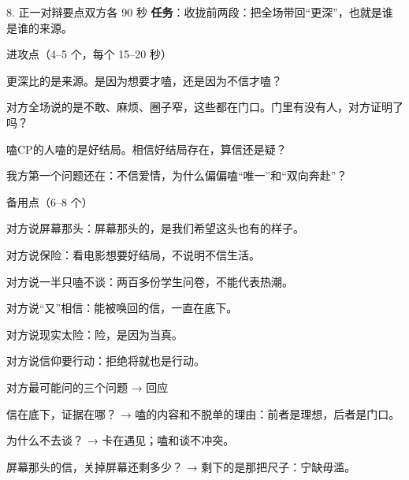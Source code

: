 \documentclass[script,pro]{debate}
\begin{document}
\begin{stage}{8. 正一对辩要点}{双方各 90 秒}
\textbf{任务}：收拢前两段：把全场带回“更深”，也就是谁是谁的来源。
\begin{points}{进攻点（4–5 个，每个 15–20 秒）}
\item 更深比的是来源。是因为想要才嗑，还是因为不信才嗑？
\item 对方全场说的是不敢、麻烦、圈子窄，这些都在门口。门里有没有人，对方证明了吗？
\item 嗑CP的人嗑的是好结局。相信好结局存在，算信还是疑？
\item 我方第一个问题还在：不信爱情，为什么偏偏嗑“唯一”和“双向奔赴”？
\end{points}
\begin{points}{备用点（6–8 个）}
\item 对方说屏幕那头：屏幕那头的，是我们希望这头也有的样子。
\item 对方说保险：看电影想要好结局，不说明不信生活。
\item 对方说一半只嗑不谈：两百多份学生问卷，不能代表热潮。
\item 对方说“又”相信：能被唤回的信，一直在底下。
\item 对方说现实太险：险，是因为当真。
\item 对方说信仰要行动：拒绝将就也是行动。
\end{points}
\begin{points}{对方最可能问的三个问题 → 回应}
\item 信在底下，证据在哪？ → 嗑的内容和不脱单的理由：前者是理想，后者是门口。
\item 为什么不去谈？ → 卡在遇见；嗑和谈不冲突。
\item 屏幕那头的信，关掉屏幕还剩多少？ → 剩下的是那把尺子：宁缺毋滥。
\end{points}
\end{stage}
\end{document}
